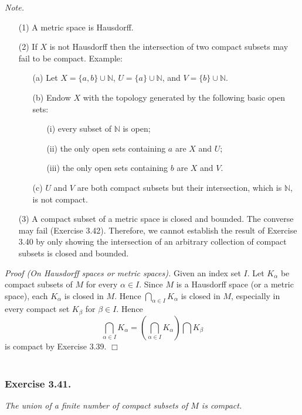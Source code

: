 \documentclass{article}
\begin{document}
\emph{Note.}
\begin{enumerate}
\item[(1)]
A metric space is Hausdorff.
\item[(2)]
If $X$ is not Hausdorff then the intersection of two compact subsets may fail to be compact.
Example:
  \begin{enumerate}
  \item[(a)]
  Let $X = \{ a, b \} \cup \mathbb{N}$,
  $U = \{ a \} \cup \mathbb{N}$,
  and $V = \{ b \} \cup \mathbb{N}$.
  \item[(b)]
  Endow $X$ with the topology generated by the following basic open sets:
    \begin{enumerate}
    \item[(i)]
    every subset of $\mathbb{N}$ is open;
    \item[(ii)]
    the only open sets containing $a$ are $X$ and $U$;
    \item[(iii)]
    the only open sets containing $b$ are $X$ and $V$.
    \end{enumerate}
  \item[(c)]
  $U$ and $V$ are both compact subsets but their intersection,
  which is $\mathbb{N}$, is not compact.
  \end{enumerate}
\item[(3)]
A compact subset of a metric space is closed and bounded.
The converse may fail (Exercise 3.42).
Therefore,
we cannot establish the result of Exercise 3.40
by only showing
the intersection of an arbitrary collection of compact subsets is closed and bounded. \\
\end{enumerate}

\emph{Proof (On Hausdorff spaces or metric spaces).}
Given an index set $I$.
Let $K_\alpha$ be compact subsets of $M$ for every $\alpha \in I$.
Since $M$ is a Hausdorff space (or a metric space),
each $K_\alpha$ is closed in $M$.
Hence
$\bigcap_{\alpha \in I} K_{\alpha}$ is closed in $M$,
especially in every compact set $K_{\beta}$ for $\beta \in I$.
Hence
$$\bigcap_{\alpha \in I} K_{\alpha}
= \left( \bigcap_{\alpha \in I} K_{\alpha} \right) \bigcap K_{\beta}$$
is compact by Exercise 3.39.
$\Box$ \\\\






\subsubsection*{Exercise 3.41.}
\emph{The union of a finite number of compact subsets of $M$ is compact.} \\
\end{document}
